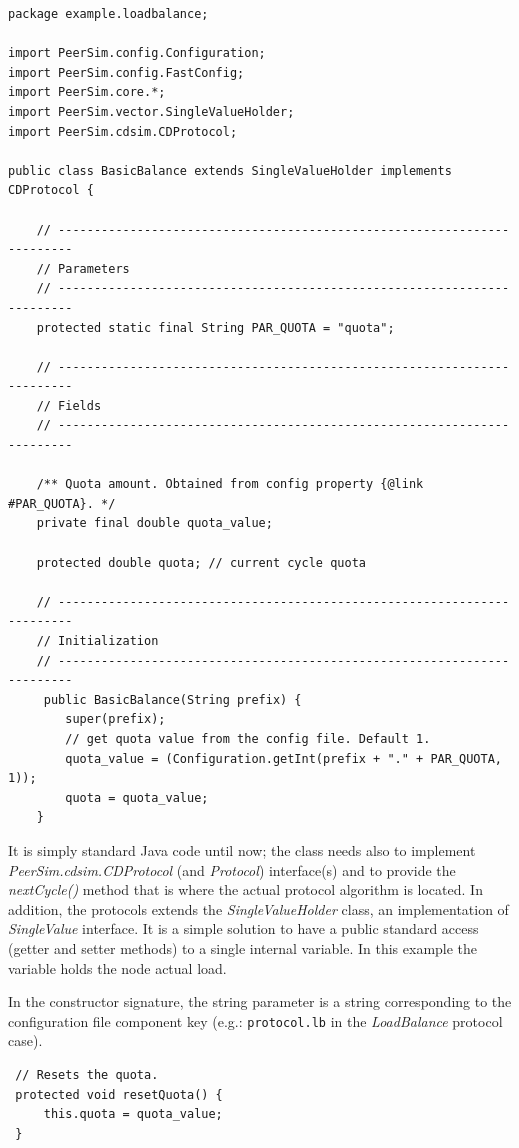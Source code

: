\documentclass[a4paper,11pt]{article}
\begin{document}
\footnotesize
\begin{verbatim}
package example.loadbalance;

import PeerSim.config.Configuration;
import PeerSim.config.FastConfig;
import PeerSim.core.*;
import PeerSim.vector.SingleValueHolder;
import PeerSim.cdsim.CDProtocol;

public class BasicBalance extends SingleValueHolder implements CDProtocol {

    // ------------------------------------------------------------------------
    // Parameters
    // ------------------------------------------------------------------------
    protected static final String PAR_QUOTA = "quota";

    // ------------------------------------------------------------------------
    // Fields
    // ------------------------------------------------------------------------

    /** Quota amount. Obtained from config property {@link #PAR_QUOTA}. */
    private final double quota_value;

    protected double quota; // current cycle quota

    // ------------------------------------------------------------------------
    // Initialization
    // ------------------------------------------------------------------------
     public BasicBalance(String prefix) {
        super(prefix);
        // get quota value from the config file. Default 1.
        quota_value = (Configuration.getInt(prefix + "." + PAR_QUOTA, 1));
        quota = quota_value;
    }
\end{verbatim}
\normalsize

It is simply standard Java code until now; the class needs also to
implement \emph{PeerSim.cdsim.CDProtocol} (and \emph{Protocol})
interface(s) and to provide  the \emph{nextCycle()} method 
that is where the actual protocol algorithm is located.
In addition, the protocols extends the \emph{SingleValueHolder} class,
an implementation of \emph{SingleValue} interface. It is a simple
solution to have a public standard access (getter and setter methods)
to a single internal variable. In this example the variable holds the
node actual load.  

In the constructor signature, the string parameter 
is a string corresponding to the configuration file component key
(e.g.: \texttt{protocol.lb} in the \emph{LoadBalance} protocol case).

\footnotesize
\begin{verbatim}
 // Resets the quota. 
 protected void resetQuota() {
     this.quota = quota_value;
 }
\end{verbatim}
\normalsize
\end{document}

